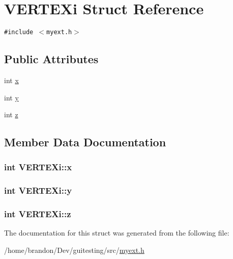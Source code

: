 \hypertarget{struct_v_e_r_t_e_xi}{
\section{VERTEXi Struct Reference}
\label{struct_v_e_r_t_e_xi}
}
{\tt \#include $<$myext.h$>$}

\subsection*{Public Attributes}
\begin{CompactItemize}
\item 
int \hyperlink{struct_v_e_r_t_e_xi_7323cc7ebb4159c020ba3816850a598a}{x}
\item 
int \hyperlink{struct_v_e_r_t_e_xi_e69638dd6724d4d6c8e4d0dce95fcd62}{y}
\item 
int \hyperlink{struct_v_e_r_t_e_xi_840b314a7170bd01bf85daaed2c0f806}{z}
\end{CompactItemize}


\subsection{Member Data Documentation}
\hypertarget{struct_v_e_r_t_e_xi_7323cc7ebb4159c020ba3816850a598a}{
\subsubsection[{x}]{\setlength{\rightskip}{0pt plus 5cm}int {\bf VERTEXi::x}}}
\label{struct_v_e_r_t_e_xi_7323cc7ebb4159c020ba3816850a598a}


\hypertarget{struct_v_e_r_t_e_xi_e69638dd6724d4d6c8e4d0dce95fcd62}{
\subsubsection[{y}]{\setlength{\rightskip}{0pt plus 5cm}int {\bf VERTEXi::y}}}
\label{struct_v_e_r_t_e_xi_e69638dd6724d4d6c8e4d0dce95fcd62}


\hypertarget{struct_v_e_r_t_e_xi_840b314a7170bd01bf85daaed2c0f806}{
\subsubsection[{z}]{\setlength{\rightskip}{0pt plus 5cm}int {\bf VERTEXi::z}}}
\label{struct_v_e_r_t_e_xi_840b314a7170bd01bf85daaed2c0f806}




The documentation for this struct was generated from the following file:\begin{CompactItemize}
\item 
/home/brandon/Dev/guitesting/src/\hyperlink{myext_8h}{myext.h}\end{CompactItemize}
